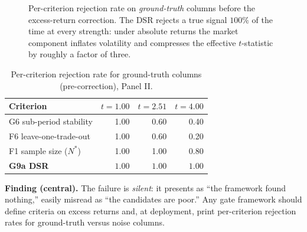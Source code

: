 \documentclass[11pt]{article}
\begin{document}
\begin{figure}[t]
\centering
{}
\caption{Per-criterion rejection rate on \emph{ground-truth} columns before the excess-return
correction. The DSR rejects a true signal $100\%$ of the time at every strength: under absolute
returns the market component inflates volatility and compresses the effective $t$-statistic by
roughly a factor of three.}
\label{fig:reject}
\end{figure}

\begin{table}[htbp]
\centering
\caption{Per-criterion rejection rate for ground-truth columns (pre-correction), Panel II.}
\label{tab:diag}
\small
\begin{tabular}{@{}lrrr@{}}
\toprule
\textbf{Criterion} & $t=1.00$ & $t=2.51$ & $t=4.00$ \\
\midrule
G6 sub-period stability & 1.00 & 0.60 & 0.40 \\
F6 leave-one-trade-out & 1.00 & 0.60 & 0.20 \\
F1 sample size ($N^{*}$) & 1.00 & 1.00 & 0.80 \\
\textbf{G9a DSR} & $\mathbf{1.00}$ & $\mathbf{1.00}$ & $\mathbf{1.00}$ \\
\bottomrule
\end{tabular}
\end{table}

\noindent\textbf{Finding (central).} The failure is \emph{silent}: it presents as ``the framework
found nothing,'' easily misread as ``the candidates are poor.'' Any gate framework should define
criteria on excess returns and, at deployment, print per-criterion rejection rates for
ground-truth versus noise columns.
\end{document}
